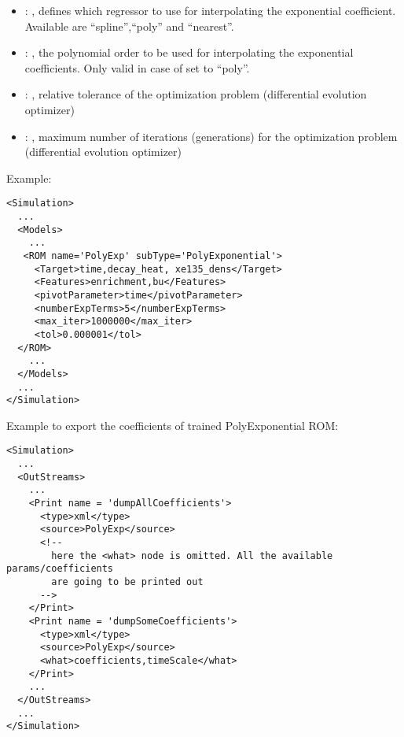\begin{itemize}
    \item {}: , 
      defines which regressor to use for interpolating the
      exponential coefficient. Available are ``spline'',``poly'' and ``nearest''.

    \item {}: , 
      the polynomial order to be used for interpolating the exponential
      coefficients. Only valid in case of   set to ``poly''.

    \item {}: , 
      relative tolerance of the optimization problem (differential evolution optimizer)

    \item {}: , 
      maximum number of iterations (generations) for the
      optimization problem  (differential evolution optimizer)
  \end{itemize}

\hspace{24pt}
Example:
\begin{lstlisting}[style=XML,morekeywords={name,subType}]
<Simulation>
  ...
  <Models>
    ...
   <ROM name='PolyExp' subType='PolyExponential'>
     <Target>time,decay_heat, xe135_dens</Target>
     <Features>enrichment,bu</Features>
     <pivotParameter>time</pivotParameter>
     <numberExpTerms>5</numberExpTerms>
     <max_iter>1000000</max_iter>
     <tol>0.000001</tol>
  </ROM>
    ...
  </Models>
  ...
</Simulation>
\end{lstlisting}

Example to export the coefficients of trained PolyExponential ROM:
\begin{lstlisting}[style=XML,morekeywords={name,subType}]
<Simulation>
  ...
  <OutStreams>
    ...
    <Print name = 'dumpAllCoefficients'>
      <type>xml</type>
      <source>PolyExp</source>
      <!--
        here the <what> node is omitted. All the available params/coefficients
        are going to be printed out
      -->
    </Print>
    <Print name = 'dumpSomeCoefficients'>
      <type>xml</type>
      <source>PolyExp</source>
      <what>coefficients,timeScale</what>
    </Print>
    ...
  </OutStreams>
  ...
</Simulation>
\end{lstlisting}


